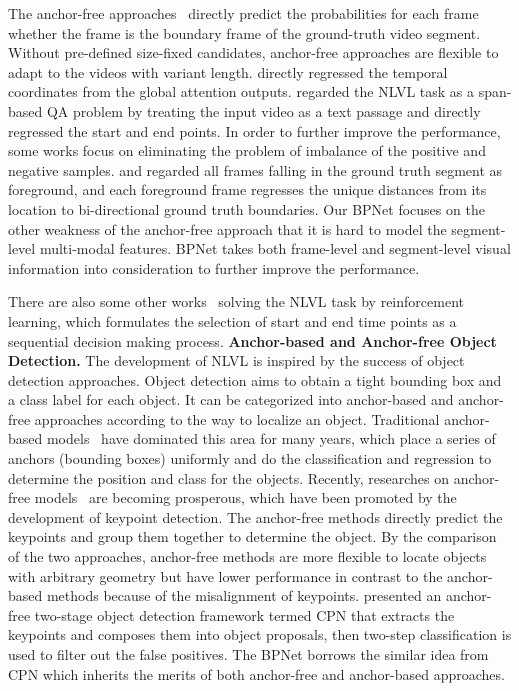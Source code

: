 \documentclass[letterpaper]{article} %
\begin{document}
The anchor-free approaches~\cite{DBLP:conf/aaai/YuanM019,LuCTLX19,DBLP:conf/aaai/ChenLTXZTL20,ChenCMJC18,DBLP:conf/acl/ZhangSJZ20} directly predict the probabilities for each frame whether the
frame is the boundary frame of the ground-truth video segment. 
Without pre-defined size-fixed candidates, anchor-free approaches are flexible to adapt to the videos with variant length. 
\citet{DBLP:conf/aaai/YuanM019} directly regressed the temporal
coordinates from the global attention outputs. 
\citet{DBLP:conf/acl/ZhangSJZ20} regarded the NLVL task as a span-based QA
problem by treating the input video as a text passage and directly regressed 
the start and end points.
In order to further improve the performance, some works focus on eliminating the problem of imbalance of the positive and negative samples. 
\citet{LuCTLX19} and \citet{DBLP:conf/aaai/ChenLTXZTL20} regarded all frames falling in the ground
truth segment as foreground, and each foreground frame regresses the unique distances from its location to bi-directional ground truth boundaries.
Our BPNet focuses on the other weakness of the anchor-free approach that it is hard 
to model the segment-level multi-modal features. BPNet takes  
both frame-level and segment-level visual information into consideration to further improve the performance.

There are also some other works~\cite{DBLP:conf/aaai/HeZHLLW19,DBLP:conf/cvpr/WangHW19} solving the NLVL task by reinforcement learning, which formulates the selection of start and end time points as a sequential decision making process.
\textbf{Anchor-based and Anchor-free Object Detection.}
The development of NLVL is inspired by the success of object detection approaches. 
Object detection aims to obtain a tight bounding box and a class label 
for each object.
It can be categorized into anchor-based and anchor-free approaches according to 
the way to localize an object. 
Traditional anchor-based models~\cite{DBLP:conf/nips/RenHGS15,DBLP:conf/nips/DaiLHS16} 
have dominated this area for many years, 
which place a series of anchors (bounding boxes) uniformly and do the classification and regression to determine the position and class for the objects.
Recently, researches on anchor-free models~\cite{DBLP:conf/eccv/LawD18,DBLP:conf/iccv/DuanBXQH019}
are becoming prosperous, which have 
been promoted by the development of keypoint detection. 
The anchor-free methods directly predict the keypoints and group them together 
to determine the object. 
By the comparison of the two approaches, anchor-free methods are more flexible to locate objects with arbitrary geometry but have lower performance in contrast to the anchor-based methods because of the misalignment of keypoints. 
\citet{DBLP:conf/eccv/Duan} presented an anchor-free two-stage object detection framework termed CPN that extracts the keypoints and composes them into object proposals, then two-step classification is used to filter out the false positives.
The BPNet borrows the similar idea from CPN which inherits the merits of both anchor-free and anchor-based approaches. 
\end{document}
